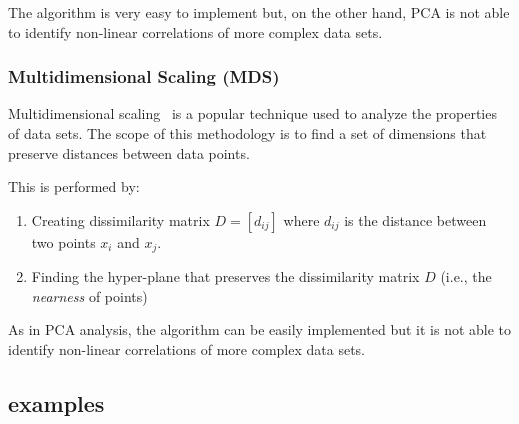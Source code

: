 


The algorithm is very easy to implement but, on the other hand, PCA is not able to identify non-linear correlations of more complex data sets.


\subsubsection{Multidimensional Scaling (MDS)}
\label{mds}

Multidimensional scaling~\cite{MDS} is a popular technique used to analyze the properties of data sets. The scope of this methodology is to find a set of dimensions that preserve distances between data points.

This is performed by:
\begin{enumerate}
  \item Creating dissimilarity matrix $D=[d_{ij}]$ where $d_{ij}$ is the distance between two points $x_i$ and $x_j$.
  \item Finding the hyper-plane that preserves the dissimilarity matrix $D$ (i.e., the \emph{nearness} of points)
\end{enumerate}

As in PCA analysis, the algorithm can be easily implemented but it is not able to identify non-linear correlations of more complex data sets.






\subsection{examples}
